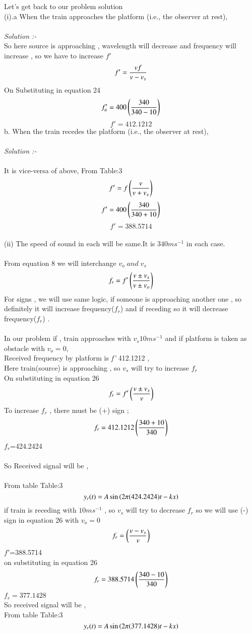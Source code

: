 \documentclass[journal,12pt,twocolumn]{IEEEtran}
\theoremstyle{remark}
\begin{document}
Let's get back to our problem solution\\
(i).a When the train approaches the platform (i.e., the observer at rest),\\\\
\textit{Solution  :-}\\
So here source is approaching , wavelength will decrease and frequency will increase , so we have to increase $f' $ \\
\begin{align}{\label{eq22}}f' = \frac{v f}{v- v_s }\end{align}
On Substituting in equation 24
$$f'_a=400\left(\frac{340}{340-10}\right)$$
$$f'=412.1212$$
\bigskip
b. When the train recedes the platform (i.e., the observer at rest), \\\\
\textit{Solution  :-}\\\\
It is vice-versa of above, From Table:3
\begin{align}f'=f\left(\frac{v}{v+v_s}\right)\end{align}
$$f'=400\left(\frac{340}{340+10}\right)$$
$$f'=388.5714$$\\
(ii) The speed of sound in each will be same.It is $340  ms^{-1}$ in each case.\\\\
From equation 8
we will interchange $v_o\; and\; v_s$ 
\begin{align}{\label{eq24}}f_r = f' \left(\frac{{v \pm v_s}}{v \pm v_o }\right)\end{align}
For signs , we will use same logic, if someone is approaching another one , so definitely it will increase frequency($f_r$) and if receding so it will decrease frequency($f_r$) . \\\\
 In our problem  if , train approaches with $v_s10 ms^{-1} $ and if platform is taken as obstacle with $v_o=0$, \\
 Received frequency by platform is \textit{f'} 412.1212   , \\
 Here train(source) is approaching , so $v_s$ will try to increase $f_r$\\
On substituting in  equation 26
\begin{align}{\label{eq24}}f_r = f' \left(\frac{{v \pm v_s}}{v }\right)\end{align}
 To increase $f_r$ , there must be (+) sign ;
 $$f_r = 412.1212\left(\frac{340 + 10}{340 }\right)$$
 $f_r$=424.2424\\ \\So Received signal will be , \\\\
 From table Table:3
 $$y_r(t) = A\sin\left( 2 \pi  (424.2424)t -kx\right)$$
 if train is receding with $10 ms^{-1} $ , so $v_s$ will try to decrease $f_r$
 so we will use (-) sign in equation 26 with $v_o=0$\\
  $$f_r =\left( \frac{v -v_s}{v }\right)$$
  $f'$=388.5714 \\
  on substituting in equation  26
  $$f_r = 388.5714 \left(\frac{340 -10}{340 }\right)$$
  $f_r=377.1428$
 \\ So received signal will be , \\
 From table Table:3
 $$y_r(t) = A\sin\left(2 \pi  (377.1428)t -k x\right)$$
\end{document}
